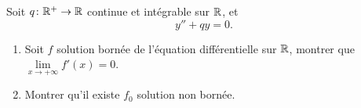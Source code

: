 \documentclass[12pt]{article}
\begin{document}
\begin{exercise}
	Soit $q\colon\mathbb{R}^{+}\to\mathbb{R}$ continue et intégrable sur $\mathbb{R}$, et 
	\begin{equation*}
		y''+qy=0.
	\end{equation*}
	\begin{enumerate}
		\item Soit $f$ solution bornée de l'équation différentielle sur $\mathbb{R}$, montrer que $\lim\limits_{x\to+\infty}f'(x)=0$.
		\item Montrer qu'il existe $f_0$ solution non bornée.
	\end{enumerate}
\end{exercise}
\end{document}
